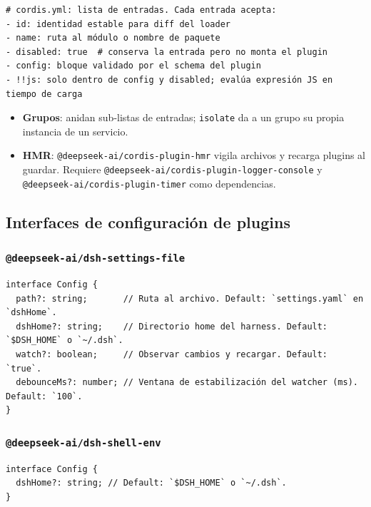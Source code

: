 \documentclass[11pt,a4paper]{article}
\begin{document}
\begin{lstlisting}
# cordis.yml: lista de entradas. Cada entrada acepta:
- id: identidad estable para diff del loader
- name: ruta al módulo o nombre de paquete
- disabled: true  # conserva la entrada pero no monta el plugin
- config: bloque validado por el schema del plugin
- !!js: solo dentro de config y disabled; evalúa expresión JS en tiempo de carga
\end{lstlisting}


\begin{itemize}[leftmargin=*,topsep=2pt,itemsep=1pt]
  \item \textbf{Grupos}: anidan sub-listas de entradas; \texttt{isolate} da a un grupo su propia instancia de un servicio.
  \item \textbf{HMR}: \texttt{@deepseek-ai/cordis-plugin-hmr} vigila archivos y recarga plugins al guardar. Requiere \texttt{@deepseek-ai/cordis-plugin-logger-console} y \texttt{@deepseek-ai/cordis-plugin-timer} como dependencias.
\end{itemize}


\subsection*{Interfaces de configuración de plugins}


\subsubsection*{\texttt{@deepseek-ai/dsh-settings-file}}


\begin{lstlisting}
interface Config {
  path?: string;       // Ruta al archivo. Default: `settings.yaml` en `dshHome`.
  dshHome?: string;    // Directorio home del harness. Default: `$DSH_HOME` o `~/.dsh`.
  watch?: boolean;     // Observar cambios y recargar. Default: `true`.
  debounceMs?: number; // Ventana de estabilización del watcher (ms). Default: `100`.
}
\end{lstlisting}


\subsubsection*{\texttt{@deepseek-ai/dsh-shell-env}}


\begin{lstlisting}
interface Config {
  dshHome?: string; // Default: `$DSH_HOME` o `~/.dsh`.
}
\end{lstlisting}
\end{document}
